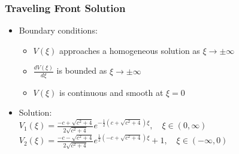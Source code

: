 \documentclass{beamer}
\begin{document}
\begin{frame}
 \frametitle{Traveling Front Solution}
\begin{itemize}
	\item Boundary conditions:
		\begin{itemize}
			\item $V(\xi)$ approaches a homogeneous solution as $\xi \rightarrow\pm\infty$
			\item $\frac{d V(\xi)}{d\xi}$ is bounded as $\xi\rightarrow\pm\infty$
			\item $V(\xi)$ is continuous and smooth at $\xi=0$
		\end{itemize}
	\item Solution: \\$V_1(\xi)=\frac{-c+\sqrt{c^2+4}}{2\sqrt{c^2+4}}e^{-\frac{1}{2}(c+\sqrt{c^2+4})\xi},\quad \xi \in (0,\infty)$\\$V_2(\xi)=\frac{-c-\sqrt{c^2+4}}{2\sqrt{c^2+4}}e^{\frac{1}{2}(-c+\sqrt{c^2+4})\xi}+1,\quad \xi \in (-\infty,0)$
\end{itemize}
	\centering
	

\end{frame}
\end{document}

